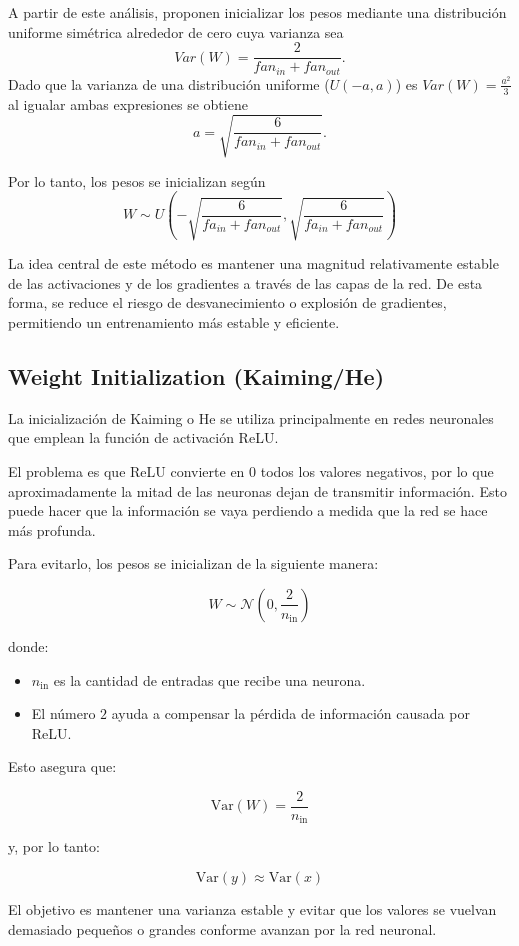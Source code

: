 \documentclass[12pt]{article}
\begin{document}
A partir de este análisis, proponen inicializar los pesos
mediante una distribución uniforme simétrica alrededor de cero
cuya varianza sea 
$$Var(W)=\frac{2}{fan_{in}+fan_{out}}.$$
Dado que la varianza de una distribución uniforme ($U(-a,a)$) es $Var(W)=\frac{a^2}{3}$
al igualar ambas expresiones se obtiene 
$$a=\sqrt{\frac{6}{fan_{in}+fan_{out}}}.$$ 

Por lo tanto, los pesos se inicializan según
$$W \sim U(-\sqrt{\frac{6}{fa_{in}+fan_{out}}}, \sqrt{\frac{6}{fa_{in}+fan_{out}}})$$

La idea central de este método es mantener una magnitud relativamente 
estable de las activaciones y de los gradientes a través de las capas 
de la red. De esta forma, se reduce el riesgo de desvanecimiento o 
explosión de gradientes, permitiendo un entrenamiento más estable y eficiente.

\subsection{Weight Initialization (Kaiming/He)}

La inicialización de Kaiming o He se utiliza principalmente en redes neuronales que emplean la función de activación ReLU.

El problema es que ReLU convierte en $0$ todos los valores negativos, por lo que aproximadamente la mitad de las neuronas dejan de transmitir información. Esto puede hacer que la información se vaya perdiendo a medida que la red se hace más profunda.

Para evitarlo, los pesos se inicializan de la siguiente manera:

\[
W \sim \mathcal{N}\left(0,\frac{2}{n_{\text{in}}}\right)
\]

donde:

\begin{itemize}
\item $n_{\text{in}}$ es la cantidad de entradas que recibe una neurona.
\item El número $2$ ayuda a compensar la pérdida de información causada por ReLU.
\end{itemize}

Esto asegura que:

\[
\text{Var}(W)=\frac{2}{n_{\text{in}}}
\]

y, por lo tanto:

\[
\text{Var}(y)\approx \text{Var}(x)
\]

El objetivo es mantener una varianza estable y evitar que los valores se vuelvan demasiado pequeños o grandes conforme avanzan por la red neuronal.
\end{document}
